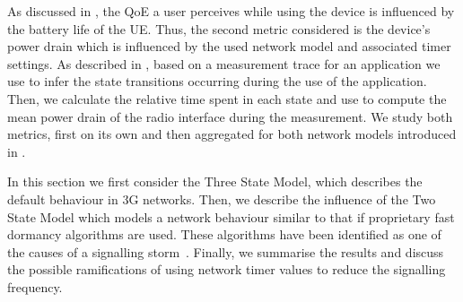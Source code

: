 As discussed in , the \gls{QoE} a user perceives while using the device is influenced by the battery life of the \gls{UE}.
Thus, the second metric considered is the device’s power drain which is influenced by the used network model and associated timer settings.
As described in , based on a measurement trace for an application we use  to infer the state transitions occurring during the use of the application.
Then, we calculate the relative time spent in each state and use  to compute the mean power
drain of the radio interface during the measurement.
We study both metrics, first on its own and then aggregated for both network models introduced in .

In this section we first consider the Three State Model, which describes the default behaviour in \gls{3G} networks. 
Then, we describe the influence of the Two State Model which models a network behaviour similar to that if proprietary fast dormancy algorithms are used.
These algorithms have been identified as one of the causes of a signalling storm~\cite{NSN2011}.
Finally, we summarise the results and discuss the possible ramifications of using network timer values to reduce the signalling frequency.

